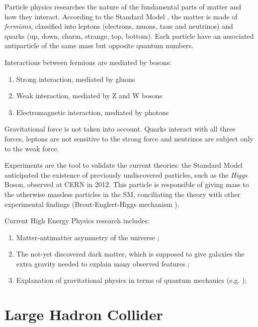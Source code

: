 Particle physics researches the nature of the fundamental parts of matter and how they interact. According to the Standard Model \cite{Quang:1998yw}, the matter is made of \textit{fermions}, classified into leptons (electrons, muons, taus and neutrinos) and quarks (up, down, charm, strange, top, bottom). Each particle have an associated antiparticle of the same mass but opposite quantum numbers.

Interactions between fermions are mediated by bosons:

\begin{enumerate}
	\item Strong interaction, mediated by gluons
	\item Weak interaction, mediated by Z and W bosons
	\item Electromagnetic interaction, mediated by photons
\end{enumerate}

Gravitational force is not taken into account. Quarks interact with all three forces, leptons are not sensitive to the strong force and neutrinos are subject only to the weak force.

Experiments are the tool to validate the current theories: the Standard Model anticipated the existence of previously undiscovered particles, such as the \textit{Higgs} Boson, observed at CERN in 2012. This particle is responsible of giving mass to the otherwise massless particles in the SM, conciliating the theory with other experimental findings (Brout-Englert-Higgs mechanism \cite{PhysRevLett.13.321, PhysRevLett.13.508}).

Current High Energy Physics research includes:
\begin{enumerate}
	\item Matter-antimatter asymmetry of the universe \cite{Bernreuther:2002uj};
	\item The not-yet discovered dark matter, which is supposed to give galaxies the extra gravity needed to explain many observed features \cite{bertone2005particle};
	\item Explanation of gravitational physics in terms of quantum mechanics (e.g. \cite{Rovelli:2011eq});
\end{enumerate}

\section{Large Hadron Collider}


